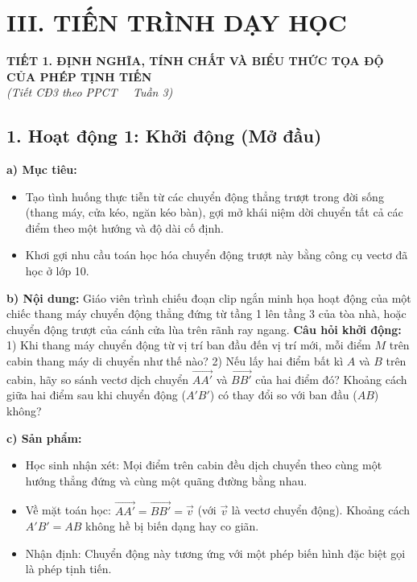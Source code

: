 \documentclass[12pt, a4paper]{article}
\renewcommand{\vec}[1]{\overrightarrow{#1}}
\begin{document}
\section*{III. TIẾN TRÌNH DẠY HỌC}  
  
\begin{center}  
    {\fontsize{13pt}{16pt}\selectfont \textbf{TIẾT 1. ĐỊNH NGHĨA, TÍNH CHẤT VÀ BIỂU THỨC TỌA ĐỘ CỦA PHÉP TỊNH TIẾN}}\\[2pt]  
    \textit{(Tiết CĐ3 theo PPCT \ \textbar \ Tuần 3)}  
\end{center}  
  
\subsection*{1. Hoạt động 1: Khởi động (Mở đầu)}  
  
\noindent \textbf{a) Mục tiêu:}  
\begin{itemize}[leftmargin=0.8cm]  
    \item Tạo tình huống thực tiễn từ các chuyển động thẳng trượt trong đời sống (thang máy, cửa kéo, ngăn kéo bàn), gợi mở khái niệm dời chuyển tất cả các điểm theo một hướng và độ dài cố định.  
    \item Khơi gợi nhu cầu toán học hóa chuyển động trượt này bằng công cụ vectơ đã học ở lớp 10.  
\end{itemize}  
  
\noindent \textbf{b) Nội dung:}  
Giáo viên trình chiếu đoạn clip ngắn minh họa hoạt động của một chiếc thang máy chuyển động thẳng đứng từ tầng 1 lên tầng 3 của tòa nhà, hoặc chuyển động trượt của cánh cửa lùa trên rãnh ray ngang.  
\textbf{Câu hỏi khởi động:}  
1) Khi thang máy chuyển động từ vị trí ban đầu đến vị trí mới, mỗi điểm $M$ trên cabin thang máy di chuyển như thế nào?  
2) Nếu lấy hai điểm bất kì $A$ và $B$ trên cabin, hãy so sánh vectơ dịch chuyển $\vec{AA'}$ và $\vec{BB'}$ của hai điểm đó? Khoảng cách giữa hai điểm sau khi chuyển động ($A'B'$) có thay đổi so với ban đầu ($AB$) không?  
  
\noindent \textbf{c) Sản phẩm:}  
\begin{itemize}[leftmargin=0.8cm]  
    \item Học sinh nhận xét: Mọi điểm trên cabin đều dịch chuyển theo cùng một hướng thẳng đứng và cùng một quãng đường bằng nhau.  
    \item Về mặt toán học: $\vec{AA'} = \vec{BB'} = \vec{v}$ (với $\vec{v}$ là vectơ chuyển động). Khoảng cách $A'B' = AB$ không hề bị biến dạng hay co giãn.  
    \item Nhận định: Chuyển động này tương ứng với một phép biến hình đặc biệt gọi là phép tịnh tiến.  
\end{itemize}  
  
\end{document}
